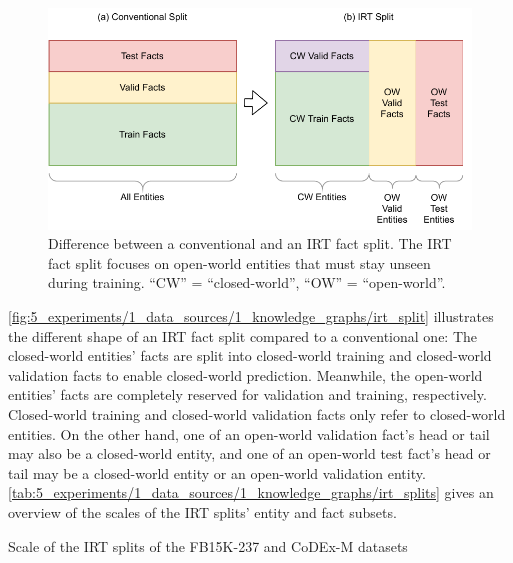\begin{figure}
    \centering
    \includegraphics[width=\textwidth]{5_experiments/1_data_sources/1_knowledge_graphs/irt_split}
    \caption{Difference between a conventional and an IRT fact split. The IRT fact split focuses on open-world entities that must stay unseen during training. ``CW'' = ``closed-world'', ``OW'' = ``open-world''.}
    \label{fig:5_experiments/1_data_sources/1_knowledge_graphs/irt_split}
\end{figure}

\autoref{fig:5_experiments/1_data_sources/1_knowledge_graphs/irt_split} illustrates the different shape of an IRT fact split compared to a conventional one: The closed-world entities' facts are split into closed-world training and closed-world validation facts to enable closed-world prediction. Meanwhile, the open-world entities' facts are completely reserved for validation and training, respectively. Closed-world training and closed-world validation facts only refer to closed-world entities. On the other hand, one of an open-world validation fact's head or tail may also be a closed-world entity, and one of an open-world test fact's head or tail may be a closed-world entity or an open-world validation entity. \autoref{tab:5_experiments/1_data_sources/1_knowledge_graphs/irt_splits} gives an overview of the scales of the IRT splits' entity and fact subsets.

\begin{table}[h]
    \centering
    
    \caption{Scale of the IRT splits of the FB15K-237 and CoDEx-M datasets}
    \label{tab:5_experiments/1_data_sources/1_knowledge_graphs/irt_splits}
\end{table}
